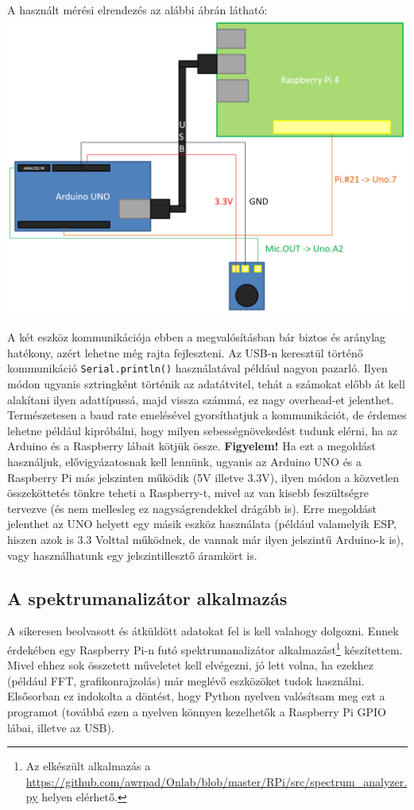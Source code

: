 \documentclass[12pt,a4paper]{article}
\begin{document}
      A használt mérési elrendezés az alábbi ábrán látható: \includegraphics[width=\textwidth]{elrendezes.png}


      A két eszköz kommunikációja ebben a megvalósításban bár biztos és aránylag hatékony, azért lehetne még rajta fejleszteni. Az USB-n keresztül történő kommunikáció \texttt{Serial.println()} használatával például nagyon pazarló. Ilyen módon ugyanis sztringként történik az adatátvitel, tehát a számokat előbb át kell alakítani ilyen adattípussá, majd vissza számmá, ez nagy overhead-et jelenthet. Természetesen a baud rate emelésével gyorsíthatjuk a kommunikációt, de érdemes lehetne például kipróbálni, hogy milyen sebességnövekedést tudunk elérni, ha az Arduino és a Raspberry lábait kötjük össze. \textbf{Figyelem!} Ha ezt a megoldást használjuk, elővigyázatosnak kell lennünk, ugyanis az Arduino UNO és a Raspberry Pi más jelszinten működik (5V illetve 3.3V), ilyen módon a közvetlen összeköttetés tönkre teheti a Raspberry-t, mivel az van kisebb feszültségre tervezve (és nem mellesleg ez nagyságrendekkel drágább is). Erre megoldást jelenthet az UNO helyett egy másik eszköz használata (például valamelyik ESP, hiszen azok is 3.3 Volttal működnek, de vannak már ilyen jelszintű Arduino-k is), vagy használhatunk egy jelszintillesztő áramkört is.

    \subsection{A spektrumanalizátor alkalmazás}
      A sikeresen beolvasott és átküldött adatokat fel is kell valahogy dolgozni. Ennek érdekében egy Raspberry Pi-n futó spektrumanalizátor alkalmazást\footnote{Az elkészült alkalmazás a \url{https://github.com/awrpad/Onlab/blob/master/RPi/src/spectrum_analyzer.py} helyen elérhető.} készítettem. Mivel ehhez sok összetett műveletet kell elvégezni, jó lett volna, ha ezekhez (például FFT, grafikonrajzolás) már meglévő eszközöket tudok használni. Elsősorban ez indokolta a döntést, hogy Python nyelven valósítsam meg ezt a programot (továbbá ezen a nyelven könnyen kezelhetők a Raspberry Pi GPIO lábai, illetve az USB).
\end{document}
